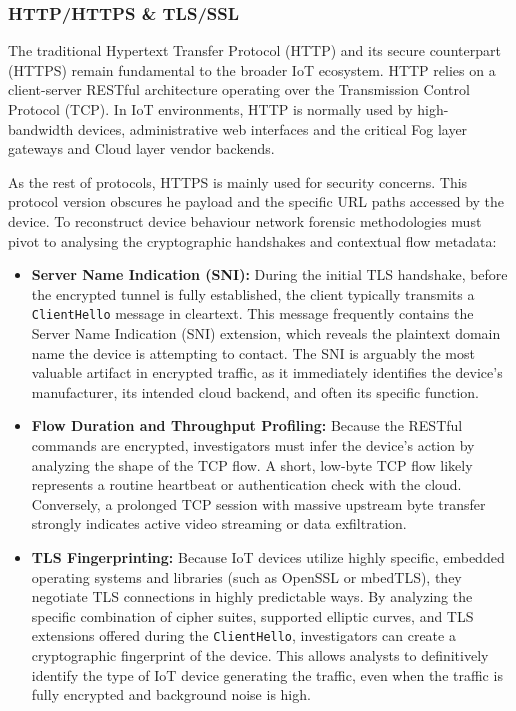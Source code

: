 \subsubsection{HTTP/HTTPS \& TLS/SSL}

The traditional Hypertext Transfer Protocol (HTTP) and its secure counterpart (HTTPS) remain fundamental to the broader IoT ecosystem. HTTP relies on a client-server RESTful architecture operating over the Transmission Control Protocol (TCP). In IoT environments, HTTP is normally used by high-bandwidth devices, administrative web interfaces and the critical Fog layer gateways and Cloud layer vendor backends. 

As the rest of protocols, HTTPS is mainly used for security concerns. This protocol version obscures he payload and the specific URL paths accessed by the device. To reconstruct device behaviour network forensic methodologies must pivot to analysing the cryptographic handshakes and contextual flow metadata: 

\begin{itemize}
	\item \textbf{Server Name Indication (SNI):} During the initial TLS handshake, before the encrypted tunnel is fully established, the client typically transmits a \texttt{ClientHello} message in cleartext. This message frequently contains the Server Name Indication (SNI) extension, which reveals the plaintext domain name the device is attempting to contact. The SNI is arguably the most valuable artifact in encrypted traffic, as it immediately identifies the device's manufacturer, its intended cloud backend, and often its specific function.
	\item \textbf{Flow Duration and Throughput Profiling:} Because the RESTful commands are encrypted, investigators must infer the device's action by analyzing the shape of the TCP flow. A short, low-byte TCP flow likely represents a routine heartbeat or authentication check with the cloud. Conversely, a prolonged TCP session with massive upstream byte transfer strongly indicates active video streaming or data exfiltration.
	\item \textbf{TLS Fingerprinting:} Because IoT devices utilize highly specific, embedded operating systems and libraries (such as OpenSSL or mbedTLS), they negotiate TLS connections in highly predictable ways. By analyzing the specific combination of cipher suites, supported elliptic curves, and TLS extensions offered during the \texttt{ClientHello}, investigators can create a cryptographic fingerprint of the device. This allows analysts to definitively identify the type of IoT device generating the traffic, even when the traffic is fully encrypted and background noise is high.
\end{itemize}


